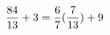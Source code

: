 \documentclass[preview]{standalone}
\begin{document}
\begin{align*}
\special{dvisvgm:raw <g id='unique000'>}\frac{84}{13} + 3 = \frac{6}{7} (\frac{7}{13}) + 9\special{dvisvgm:raw </g>}
\end{align*}
\end{document}
